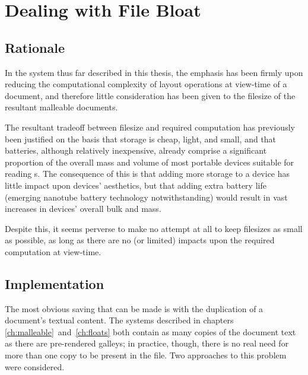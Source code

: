 \chapter{Dealing with File Bloat}\label{ch:bloat}

\section{Rationale}
In the system thus far described in this thesis, the emphasis has been firmly upon reducing the computational complexity of layout operations at view-time of a document, and therefore little consideration has been given to the filesize of the resultant malleable documents.


The resultant tradeoff between filesize and required computation has previously been justified on the basis that storage is cheap, light, and small, and that batteries, although relatively inexpensive, already comprise a significant proportion of the overall mass and volume of most portable devices suitable for reading \ebook{}s. The consequence of this is that adding more storage to a device has little impact upon devices' aesthetics, but that adding extra battery life (emerging nanotube battery technology notwithstanding) would result in vast increases in devices' overall bulk and mass.

Despite this, it seems perverse to make no attempt at all to keep filesizes as small as possible, as long as there are no (or limited) impacts upon the required computation at view-time.

\section{Implementation}
The most obvious saving that can be made is with the duplication of a document's textual content. The systems described in chapters \ref{ch:malleable}~and~\ref{ch:floats} both contain as many copies of the document text as there are pre-rendered galleys; in practice, though, there is no real need for more than one copy to be present in the file. Two approaches to this problem were considered.

